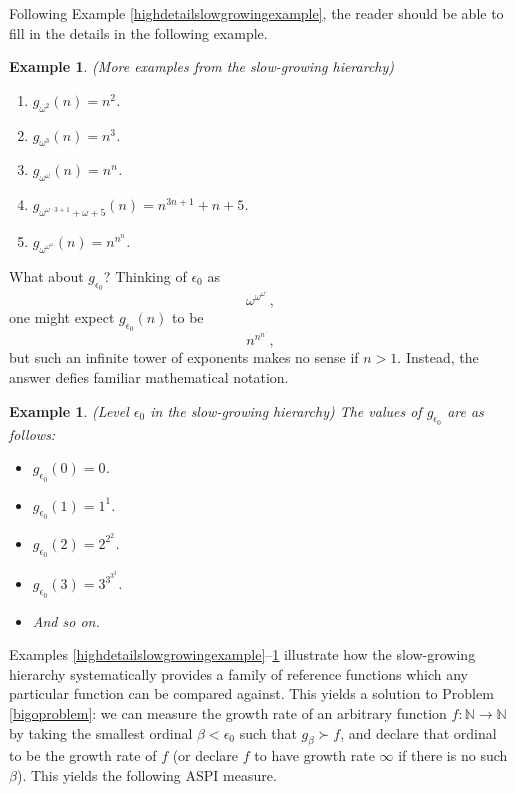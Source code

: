 \documentclass{article}
\newtheorem{example}[theorem]{Example}
\begin{document}
Following Example \ref{highdetailslowgrowingexample}, the reader should be able
to fill in the details in the following example.

\begin{example}
    (More examples from the slow-growing hierarchy)
    \begin{enumerate}
        \item
        $g_{\omega^2}(n)=n^2$.
        \item
        $g_{\omega^3}(n)=n^3$.
        \item
        $g_{\omega^\omega}(n)=n^n$.
        \item
        $g_{\omega^{\omega\cdot 3+1}+\omega+5}(n)=n^{3n+1}+n+5$.
        \item
        $g_{\omega^{\omega^{\omega}}}(n)=n^{n^n}$.
    \end{enumerate}
\end{example}

What about $g_{\epsilon_0}$? Thinking of $\epsilon_0$ as
\[\omega^{\omega^{\omega^{\iddots}}},\]
one might expect $g_{\epsilon_0}(n)$ to be
\[n^{n^{n^{\iddots}}},\]
but such an infinite tower
of exponents makes no sense if $n>1$. Instead, the answer defies familiar mathematical
notation.

\begin{example}
\label{epsilon0example}
(Level $\epsilon_0$ in the slow-growing hierarchy)
The values of $g_{\epsilon_0}$ are as follows:
\begin{itemize}
    \item
    $g_{\epsilon_0}(0)=0$.
    \item
    $g_{\epsilon_0}(1)=1^1$.
    \item
    $g_{\epsilon_0}(2)=2^{2^2}$.
    \item
    $g_{\epsilon_0}(3)=3^{3^{3^3}}$.
    \item
    And so on.
\end{itemize}
\end{example}

Examples \ref{highdetailslowgrowingexample}--\ref{epsilon0example} illustrate
how the slow-growing hierarchy systematically provides a family of reference
functions which any particular function can be compared against.
This yields a solution to Problem \ref{bigoproblem}: we can measure the growth
rate of an arbitrary function $f:\mathbb N\to\mathbb N$ by taking the smallest ordinal
$\beta< \epsilon_0$ such that $g_\beta\succ f$, and declare that ordinal to be the
growth rate of $f$ (or declare $f$ to have growth rate $\infty$ if there is no such
$\beta$). This yields the following ASPI measure.
\end{document}
